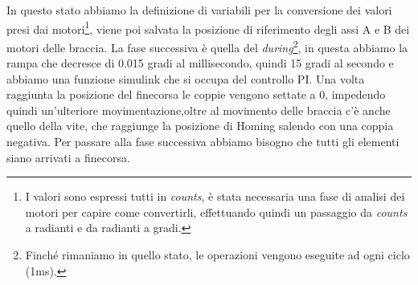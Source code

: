 \par In questo stato abbiamo la definizione di variabili per la conversione dei valori presi dai motori\footnote{I valori sono espressi tutti in \textit{counts},  è stata necessaria una fase di analisi dei motori per capire come convertirli, effettuando quindi un passaggio da \textit{counts} a radianti e da radianti a gradi.}, viene poi salvata la posizione di riferimento degli assi A e B dei motori delle braccia. La fase successiva è quella del \textit{during}\footnote{Finché rimaniamo in quello stato, le operazioni vengono eseguite ad ogni ciclo (1ms).}, in questa abbiamo la rampa che decresce di 0.015 gradi al millisecondo, quindi 15 gradi al secondo e abbiamo una funzione simulink che si occupa del controllo PI. Una volta raggiunta la posizione del finecorsa le coppie vengono settate a 0, impedendo quindi un'ulteriore movimentazione,oltre al movimento delle braccia c'è anche quello della vite, che raggiunge la posizione di Homing salendo con una coppia negativa. Per passare alla fase successiva abbiamo bisogno che tutti gli elementi siano arrivati a finecorsa.
